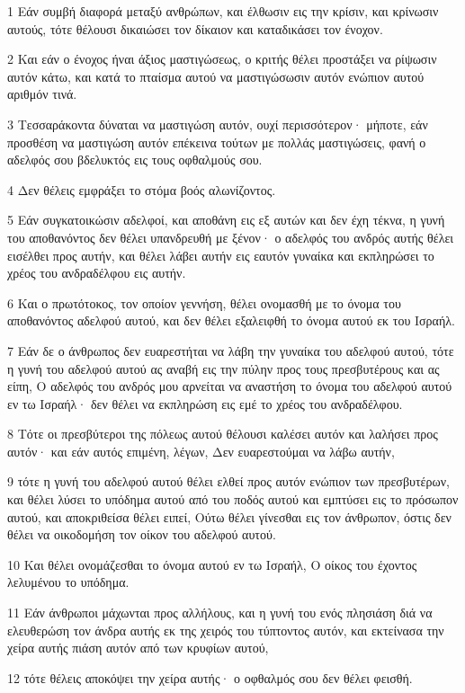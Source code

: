 \par 1 Εάν συμβή διαφορά μεταξύ ανθρώπων, και έλθωσιν εις την κρίσιν, και κρίνωσιν αυτούς, τότε θέλουσι δικαιώσει τον δίκαιον και καταδικάσει τον ένοχον.
\par 2 Και εάν ο ένοχος ήναι άξιος μαστιγώσεως, ο κριτής θέλει προστάξει να ρίψωσιν αυτόν κάτω, και κατά το πταίσμα αυτού να μαστιγώσωσιν αυτόν ενώπιον αυτού αριθμόν τινά.
\par 3 Τεσσαράκοντα δύναται να μαστιγώση αυτόν, ουχί περισσότερον· μήποτε, εάν προσθέση να μαστιγώση αυτόν επέκεινα τούτων με πολλάς μαστιγώσεις, φανή ο αδελφός σου βδελυκτός εις τους οφθαλμούς σου.
\par 4 Δεν θέλεις εμφράξει το στόμα βοός αλωνίζοντος.
\par 5 Εάν συγκατοικώσιν αδελφοί, και αποθάνη εις εξ αυτών και δεν έχη τέκνα, η γυνή του αποθανόντος δεν θέλει υπανδρευθή με ξένον· ο αδελφός του ανδρός αυτής θέλει εισέλθει προς αυτήν, και θέλει λάβει αυτήν εις εαυτόν γυναίκα και εκπληρώσει το χρέος του ανδραδέλφου εις αυτήν.
\par 6 Και ο πρωτότοκος, τον οποίον γεννήση, θέλει ονομασθή με το όνομα του αποθανόντος αδελφού αυτού, και δεν θέλει εξαλειφθή το όνομα αυτού εκ του Ισραήλ.
\par 7 Εάν δε ο άνθρωπος δεν ευαρεστήται να λάβη την γυναίκα του αδελφού αυτού, τότε η γυνή του αδελφού αυτού ας αναβή εις την πύλην προς τους πρεσβυτέρους και ας είπη, Ο αδελφός του ανδρός μου αρνείται να αναστήση το όνομα του αδελφού αυτού εν τω Ισραήλ· δεν θέλει να εκπληρώση εις εμέ το χρέος του ανδραδέλφου.
\par 8 Τότε οι πρεσβύτεροι της πόλεως αυτού θέλουσι καλέσει αυτόν και λαλήσει προς αυτόν· και εάν αυτός επιμένη, λέγων, Δεν ευαρεστούμαι να λάβω αυτήν,
\par 9 τότε η γυνή του αδελφού αυτού θέλει ελθεί προς αυτόν ενώπιον των πρεσβυτέρων, και θέλει λύσει το υπόδημα αυτού από του ποδός αυτού και εμπτύσει εις το πρόσωπον αυτού, και αποκριθείσα θέλει ειπεί, Ούτω θέλει γίνεσθαι εις τον άνθρωπον, όστις δεν θέλει να οικοδομήση τον οίκον του αδελφού αυτού.
\par 10 Και θέλει ονομάζεσθαι το όνομα αυτού εν τω Ισραήλ, Ο οίκος του έχοντος λελυμένου το υπόδημα.
\par 11 Εάν άνθρωποι μάχωνται προς αλλήλους, και η γυνή του ενός πλησιάση διά να ελευθερώση τον άνδρα αυτής εκ της χειρός του τύπτοντος αυτόν, και εκτείνασα την χείρα αυτής πιάση αυτόν από των κρυφίων αυτού,
\par 12 τότε θέλεις αποκόψει την χείρα αυτής· ο οφθαλμός σου δεν θέλει φεισθή.
